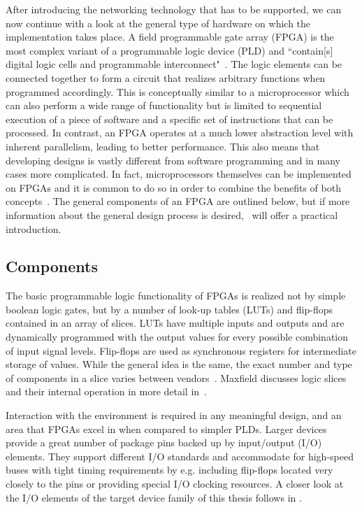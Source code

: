 \documentclass[a4paper, 11pt, oneside]{Thesis}  %
\begin{document}
After introducing the networking technology that has to be supported, we can now continue with a look at the general type of hardware on which the implementation takes place. A field programmable gate array (FPGA) is the most complex variant of a programmable logic device (PLD) and ``contain[s] digital logic cells and programmable interconnect"~\cite{DigSysDesign}. The logic elements can be connected together to form a circuit that realizes arbitrary functions when programmed accordingly. This is conceptually similar to a microprocessor which can also perform a wide range of functionality but is limited to sequential execution of a piece of software and a specific set of instructions that can be processed. In contrast, an FPGA operates at a much lower abstraction level with inherent parallelism, leading to better performance. This also means that developing designs is vastly different from software programming and in many cases more complicated. In fact, microprocessors themselves can be implemented on FPGAs and it is common to do so in order to combine the benefits of both concepts~\cite{FPGAInstantAccess}. The general components of an FPGA are outlined below, but if more information about the general design process is desired,~\cite{FPGA101} will offer a practical introduction.

\subsection{Components}

The basic programmable logic functionality of FPGAs is realized not by simple boolean logic gates, but by a number of look-up tables (LUTs) and flip-flops contained in an array of slices. LUTs have multiple inputs and outputs and are dynamically programmed with the output values for every possible combination of input signal levels. Flip-flops are used as synchronous registers for intermediate storage of values. While the general idea is the same, the exact number and type of components in a slice varies between vendors~\cite{DigSysDesign}. Maxfield discusses logic slices and their internal operation in more detail in~\cite{FPGAInstantAccess}.

Interaction with the environment is required in any meaningful design, and an area that FPGAs excel in when compared to simpler PLDs. Larger devices provide a great number of package pins backed up by input/output (I/O) elements. They support different I/O standards and accommodate for high-speed buses with tight timing requirements by e.g. including flip-flops located very closely to the pins or providing special I/O clocking resources. A closer look at the I/O elements of the target device family of this thesis follows in .
\end{document}
